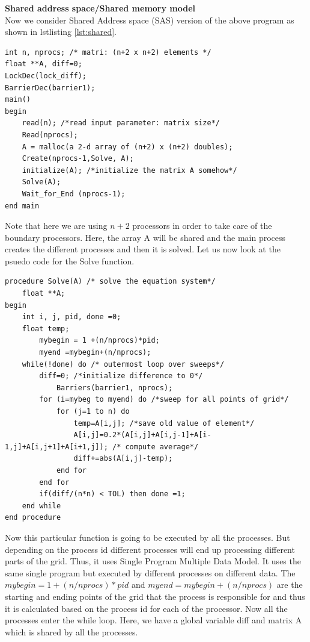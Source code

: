 \documentclass[12pt]{article}
\begin{document}
\textbf{Shared address space/Shared memory model}\\
Now we consider Shared Address space (SAS) version of the above program as shown in lstlisting \ref{lst:shared}.
\begin{lstlisting}[caption={Shared Address Space Version},captionpos=b,label={lst:shared}]
int n, nprocs; /* matri: (n+2 x n+2) elements */
float **A, diff=0;
LockDec(lock_diff);
BarrierDec(barrier1);
main()
begin
    read(n); /*read input parameter: matrix size*/
    Read(nprocs);
    A = malloc(a 2-d array of (n+2) x (n+2) doubles);
    Create(nprocs-1,Solve, A);
    initialize(A); /*initialize the matrix A somehow*/
    Solve(A);
    Wait_for_End (nprocs-1);
end main
\end{lstlisting}
Note that here we are using $n+2$ processors in order to take care of the boundary processors.
Here, the array A will be shared and the main process creates the different processes and then it is solved.
Let us now look at the psuedo code for the Solve function.
\begin{lstlisting}[caption={Solve Function},captionpos=b,label={lst:solve}]
procedure Solve(A) /* solve the equation system*/
    float **A;
begin
    int i, j, pid, done =0;
    float temp;
        mybegin = 1 +(n/nprocs)*pid;
        myend =mybegin+(n/nprocs);
    while(!done) do /* outermost loop over sweeps*/
        diff=0; /*initialize difference to 0*/
            Barriers(barrier1, nprocs);
        for (i=mybeg to myend) do /*sweep for all points of grid*/
            for (j=1 to n) do
                temp=A[i,j]; /*save old value of element*/
                A[i,j]=0.2*(A[i,j]+A[i,j-1]+A[i-1,j]+A[i,j+1]+A[i+1,j]); /* compute average*/
                diff+=abs(A[i,j]-temp);
            end for
        end for
        if(diff/(n*n) < TOL) then done =1;
    end while
end procedure
\end{lstlisting}
Now this particular function is going to be executed by all the processes. But depending on the 
process id different processes will end up processing different parts of the grid. Thus, it uses Single Program Multiple Data Model.
It uses the same single program but executed by different processes on different data.
The $mybegin=1+(n/nprocs)*pid$ and $myend=mybegin+(n/nprocs)$ are the starting and ending points of the grid that the process is responsible for and thus it is calculated based on the process id for each of the processor.
Now all the processes enter the while loop. Here, we have a global variable diff and matrix A which is shared by all the processes.
\end{document}
